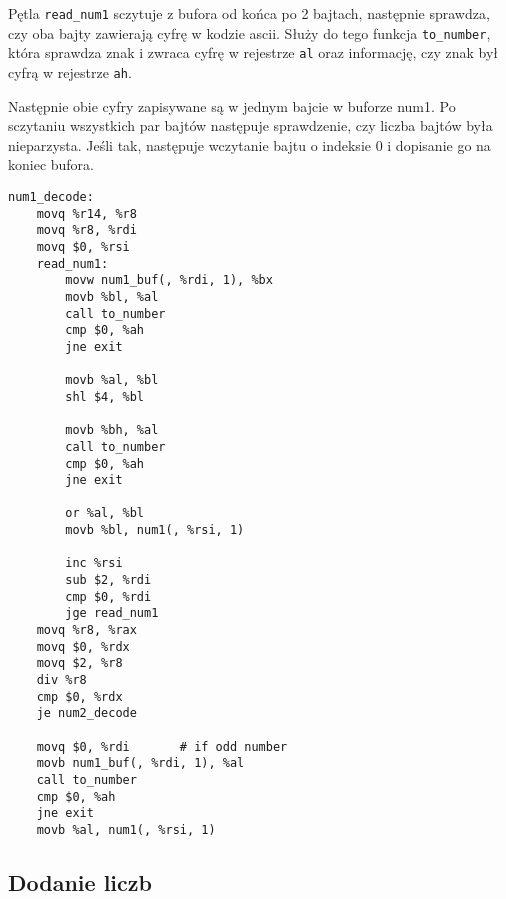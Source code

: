 \documentclass[polish, 11pt]{article}
\begin{document}
		\begin{minipage}{.4\textwidth}
			Pętla \texttt{read\_num1} sczytuje z bufora od końca po 2 bajtach,
			następnie sprawdza, czy oba bajty zawierają cyfrę w kodzie ascii.
			Służy do tego funkcja \texttt{to\_number},
			która sprawdza znak i zwraca cyfrę w rejestrze \texttt{al} oraz
			informację, czy znak był cyfrą w rejestrze \texttt{ah}.
			
			Następnie obie cyfry zapisywane są w jednym bajcie w buforze num1.
			Po sczytaniu wszystkich par bajtów następuje sprawdzenie,
			czy liczba bajtów była nieparzysta.
			Jeśli tak, następuje wczytanie bajtu o indeksie 0 i dopisanie go na koniec bufora.
		\end{minipage}%
		\hspace{1cm}
		\begin{minipage}{.5\textwidth}	%
			\begin{lstlisting}	
num1_decode:
	movq %r14, %r8
	movq %r8, %rdi
	movq $0, %rsi
	read_num1:
		movw num1_buf(, %rdi, 1), %bx
		movb %bl, %al
		call to_number
		cmp $0, %ah
		jne exit

		movb %al, %bl
		shl $4, %bl

		movb %bh, %al
		call to_number
		cmp $0, %ah
		jne exit

		or %al, %bl
		movb %bl, num1(, %rsi, 1)

		inc %rsi
		sub $2, %rdi
		cmp $0, %rdi
		jge read_num1
	movq %r8, %rax
	movq $0, %rdx
	movq $2, %r8
	div %r8
	cmp $0, %rdx
	je num2_decode

	movq $0, %rdi       # if odd number
	movb num1_buf(, %rdi, 1), %al
	call to_number
	cmp $0, %ah
	jne exit
	movb %al, num1(, %rsi, 1)

			\end{lstlisting}	%
		\end{minipage}

	\subsection{Dodanie liczb}
\end{document}
